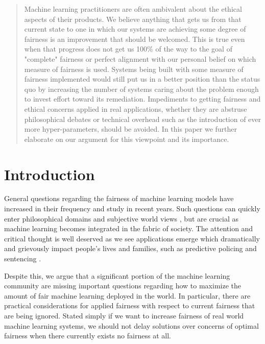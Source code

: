 \documentclass[11pt]{article}
\begin{document}
\maketitle
\begin{abstract}

Machine learning practitioners are often ambivalent about the ethical aspects of their products. We believe anything that gets us from that current state to one in which our systems are achieving some degree of fairness is an improvement that should be welcomed. This is true even when that progress does not get us 100\% of the way to the goal of "complete" fairness or perfect alignment with our personal belief on which measure of fairness is used. Systems being built with some measure of fairness implemented would still put us in a better position than the status quo by increasing the number of systems caring about the problem enough to invest effort toward its remediation. Impediments to getting fairness and ethical concerns applied in real applications, whether they are  abstruse philosophical debates or technical overhead such as the introduction of ever more hyper-parameters, should be avoided. In this paper we further elaborate on our argument for this viewpoint and its importance. 
\end{abstract}


\section{Introduction}

General questions regarding the fairness of machine learning models have increased in their frequency and study in recent years. Such questions can quickly enter philosophical domains and subjective world views \cite{pmlr-v81-binns18a}, but are crucial as machine learning becomes integrated in the fabric of society. The attention and critical thought is well deserved as we see applications emerge which dramatically and grievously impact people's lives and families, such as predictive policing \cite{pmlr-v81-ensign18a} and sentencing \cite{Chouldechova2017,pmlr-v81-barabas18a}.

Despite this, we argue that a significant portion of the machine learning community are missing important questions regarding how to maximize the amount of fair machine learning deployed in the world. In particular, there are practical considerations for applied fairness with respect to current fairness that are being ignored. Stated simply if we want to increase fairness of real world machine learning systems, we should not delay solutions over concerns of optimal fairness when there currently exists no fairness at all. 
\end{document}

